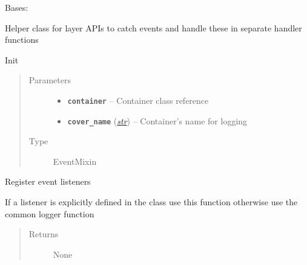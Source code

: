 \documentclass[letterpaper,10pt,english]{sphinxmanual}
\begin{document}
\begin{fulllineitems}
\label{util/misc:escape.util.misc.SimpleStandaloneHelper}
Bases: \href{https://docs.python.org/2.7/library/functions.html\#object}{}

Helper class for layer APIs to catch events and handle these in separate
handler functions

\begin{fulllineitems}
\label{util/misc:escape.util.misc.SimpleStandaloneHelper.__init__}
Init
\begin{quote}\begin{description}
\item[{Parameters}] \leavevmode\begin{itemize}
\item {} 
\textbf{\texttt{container}} -- Container class reference

\item {} 
\textbf{\texttt{cover\_name}} (\href{https://docs.python.org/2.7/library/functions.html\#str}{\emph{str}}) -- Container's name for logging

\end{itemize}

\item[{Type}] \leavevmode
EventMixin

\end{description}\end{quote}

\end{fulllineitems}


\begin{fulllineitems}
\label{util/misc:escape.util.misc.SimpleStandaloneHelper._register_listeners}
Register event listeners

If a listener is explicitly defined in the class use this function
otherwise use the common logger function
\begin{quote}\begin{description}
\item[{Returns}] \leavevmode
None


\end{description}
\end{quote}
\end{fulllineitems}
\end{fulllineitems}
\end{document}
